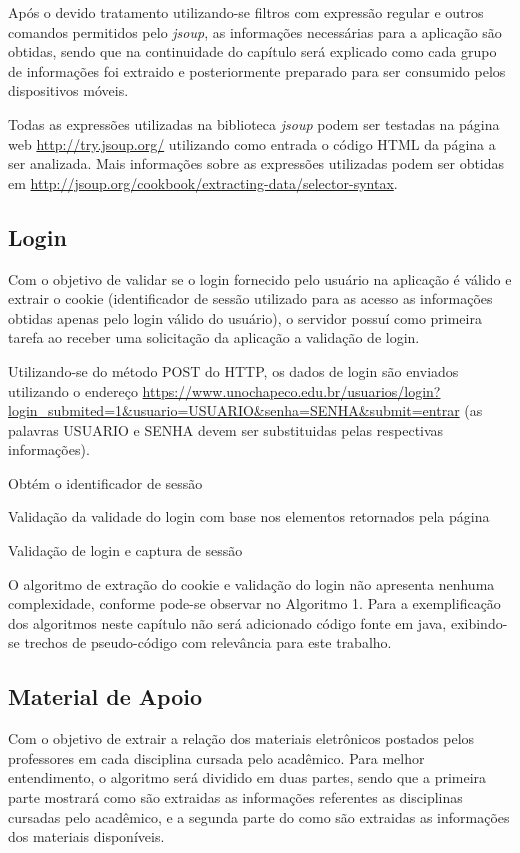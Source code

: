 Após o devido tratamento utilizando-se filtros com expressão regular e outros comandos permitidos pelo \emph{jsoup}, as informações necessárias para a aplicação são obtidas, sendo que na continuidade do capítulo será explicado como cada grupo de informações foi extraido e posteriormente preparado para ser consumido pelos dispositivos móveis.

Todas as expressões utilizadas na biblioteca \emph{jsoup} podem ser testadas na página web \url{http://try.jsoup.org/} utilizando como entrada o código HTML da página a ser analizada. Mais informações sobre as expressões utilizadas podem ser obtidas em \url{http://jsoup.org/cookbook/extracting-data/selector-syntax}.


\subsection{Login}
Com o objetivo de validar se o login fornecido pelo usuário na aplicação é válido e extrair o cookie (identificador de sessão utilizado para as acesso as informações obtidas apenas pelo login válido do usuário), o servidor possuí como primeira tarefa ao receber uma solicitação da aplicação a validação de login.

Utilizando-se do método POST do HTTP, os dados de login são enviados utilizando o endereço \url{https://www.unochapeco.edu.br/usuarios/login?login_submited=1&usuario=USUARIO&senha=SENHA&submit=entrar} (as palavras USUARIO e SENHA devem ser substituidas pelas respectivas informações).

\begin{algorithm}[H]
 \SetAlgoLined

 {
  Obtém o identificador de sessão\;
 }
 
 Validação da validade do login com base nos elementos retornados pela página\; 
 
\caption{Validação de login e captura de sessão}
\end{algorithm}

O algoritmo de extração do cookie e validação do login não apresenta nenhuma complexidade, conforme pode-se observar no Algoritmo 1. Para a exemplificação dos algoritmos neste capítulo não será adicionado código fonte em java, exibindo-se trechos de pseudo-código com relevância para este trabalho.

\subsection{Material de Apoio}
Com o objetivo de extrair a relação dos materiais eletrônicos postados pelos professores em cada disciplina cursada pelo acadêmico. Para melhor entendimento, o algoritmo será dividido em duas partes, sendo que a primeira parte mostrará como são extraidas as informações referentes as disciplinas cursadas pelo acadêmico, e a segunda parte do como são extraidas as informações dos materiais disponíveis.

